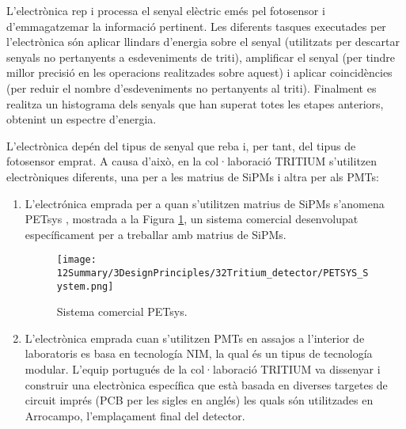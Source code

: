 L'electrònica rep i processa el senyal elèctric emés pel fotosensor i d'emmagatzemar la informació pertinent. Les diferents tasques executades per l'electrònica són aplicar llindars d'energia sobre el senyal (utilitzats per descartar senyals no pertanyents a esdeveniments de triti), amplificar el senyal (per tindre millor precisió en les operacions realitzades sobre aquest) i aplicar coincidències (per reduir el nombre d'esdeveniments no pertanyents al triti). Finalment es realitza un histograma dels senyals que han superat totes les etapes anteriors, obtenint un espectre d'energia. 

L'electrònica depén del tipus de senyal que reba i, per tant, del tipus de fotosensor emprat. A causa d'això, en la col·laboració TRITIUM s'utilitzen electròniques diferents, una per a les matrius de SiPMs i altra per als PMTs:

\begin{enumerate}

\item{} L'electrónica emprada per a quan s'utilitzen matrius de SiPMs s'anomena PETsys \cite{PETSYS}, mostrada a la Figura \ref{fig:PETSYSs}, un sistema comercial desenvolupat específicament per a treballar amb matrius de SiPMs. 

\begin{figure}[h]
\texttt{[image: 12Summary/3DesignPrinciples/32Tritium\_detector/PETSYS\_System.png]}
\centering
\caption{Sistema comercial PETsys\label{fig:PETSYSs}.}
\end{figure}

\item{} L'electrònica emprada cuan s'utilitzen PMTs en assajos a l'interior de laboratoris es basa en tecnología NIM, la qual és un tipus de tecnología modular. L'equip portugués de la col·laboració TRITIUM va dissenyar i construir una electrònica específica que està basada en diverses targetes de circuit imprés (PCB per les sigles en anglés) les quals són utilitzades en Arrocampo, l'emplaçament final del detector.

\end{enumerate}